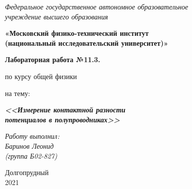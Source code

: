 \thispagestyle{empty}
\begin{center}
    \textit{Федеральное государственное автономное образовательное\\ учреждение высшего образования }

    \vspace{0.5ex}

        \textbf{«Московский физико-технический институт\\ (национальный исследовательский университет)»}
\end{center}

\vspace{10ex}

\begin{center}
    \vspace{13ex}

    \textbf{Лабораторная работа №11.3.}

    \vspace{1ex}

    по курсу общей физики

    на тему:

    \textbf{\textit{<<Измерение контактной разности\\ потенциалов
    в полупроводниках>>}}

    \vspace{30ex}

    \begin{flushright}
        \noindent
        \textit{Работу выполнил:}\\  
        \textit{Баринов Леонид \\(группа Б02-827)}
    \end{flushright}
    \vfill
    Долгопрудный \\2021
\newpage
\setcounter{page}{1}
\fancyhead[R]{\nouppercase{\leftmark}}	
\end{center}
